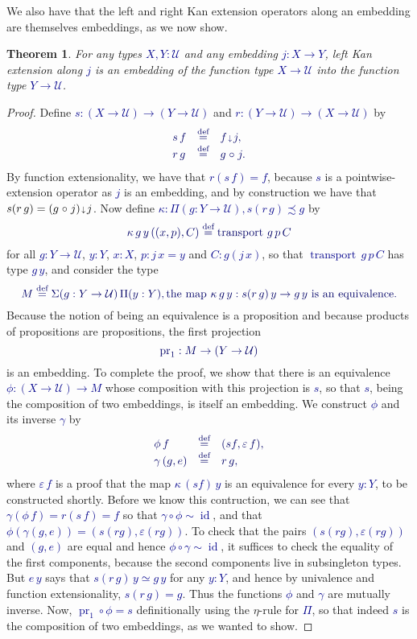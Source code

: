 \documentclass[10pt]{article}
\newcommand{\db}{\textcolor{darkblue}}
\newcommand{\m}[1]{\db{$#1$}}
\newcommand{\M}[1]{\[\db{#1}\]}
\newcommand{\transport}{\operatorname{transport}}
\newcommand{\fst}{\operatorname{pr}_1}
\newcommand{\id}{\operatorname{id}}
\newcommand{\comp}{\mathrel{\circ}}
\newcommand{\U}{\mathcal{U}}
\newcommand{\eqdef}{\overset{\text{def}}{=}}
\newcommand{\edown}{\scaleobj{0.7}{\,\downarrow\,}}
\newtheorem{theorem}[numbered]{Theorem}
\theoremstyle{definition}
\begin{document}
We also have that the left and right Kan extension operators along an
embedding are themselves embeddings, as we now show.
\begin{theorem}
For any types \m{X,Y:\U} and any embedding \m{j : X \to Y}, left Kan extension along \m{j} is an embedding of the function type \m{X \to \U} into the function type \m{Y \to \U}.
\end{theorem}
\begin{proof}
  Define \m{s : (X \to \U) \to (Y \to \U)} and \m{r : (Y \to \U) \to (X \to \U)} by
  \M{
    \begin{array}{lll}
      s \, f & \eqdef & f \edown j, \\
      r \,  g & \eqdef & g \comp j.
    \end{array}
  }
  By function extensionality, we have that \m{r (s \, f) = f}, because
  \m{s} is a pointwise-extension operator as \m{j} is an embedding,
  and by construction we have that \m{s (r \, g) = (g \comp j) \edown
    j}. Now define \m{\kappa : \Pi (g : Y \to \U), s(r \,g) \precsim
    g} by
  \M{
    \kappa \, g \, y \, ((x , p) , C) \eqdef \transport \, g \, p \, C
  }
  for all \m{g : Y \to \U}, \m{y : Y}, \m{x : X}, \m{p : j \, x = y} and \m{C : g(j \, x)}, so that
  \m{\transport \, g \, p \, C} has type \m{g \, y },
  and consider the type
  \M{
    M \eqdef \Sigma (g : Y \to \U)\,\Pi(y:Y), \text{the map \m{\kappa \, g \, y : s (r \, g) \, y \to g \, y} is an equivalence.}
  }
  Because the notion of being an equivalence is a proposition and
  because products of propositions are propositions, the first projection
  \M{\fst : M \to (Y \to \U)} is an embedding.  To complete the proof,
  we show that there is an equivalence \m{\phi : (X \to \U) \to M}
  whose composition with this projection is \m{s}, so that \m{s},
  being the composition of two embeddings, is itself an embedding.  We
  construct \m{\phi} and its inverse \m{\gamma} by
  \M{
    \begin{array}{lll}
      \phi \, f & \eqdef & (s f , \varepsilon \, f), \\
      \gamma \, (g , e) & \eqdef & r \, g,
    \end{array}
  }
  where \m{\varepsilon \, f} is a proof that the map \m{\kappa \, (s
    f) \, y} is an equivalence for every \m{y : Y}, to be constructed
  shortly.  Before we know this contruction, we can see that \m{\gamma
    (\phi \, f) = r (s \, f) = f} so that \m{\gamma \comp \phi \sim
    \id}, and that \m{\phi (\gamma (g , e)) = (s(r g) , \varepsilon (r
    g))}.  To check that the pairs \m{(s(r g) , \varepsilon (r g))}
  and \m{(g , e)} are equal and hence \m{\phi \comp \gamma \sim \id},
  it suffices to check the equality of the first components, because
  the second components live in subsingleton types.  But \m{e \, y}
  says that \m{s (r \, g) \, y \simeq g \, y} for any \m{y:Y}, and
  hence by univalence and function extensionality, \m{s (r \, g) = g}.
  Thus the functions \m{\phi} and \m{\gamma} are mutually
  inverse. Now, \m{\fst \comp \phi = s} definitionally using the
  $\eta$-rule for \m{\Pi}, so that indeed \m{s} is the composition of
  two embeddings, as we wanted to show.


\end{proof}
\end{document}
